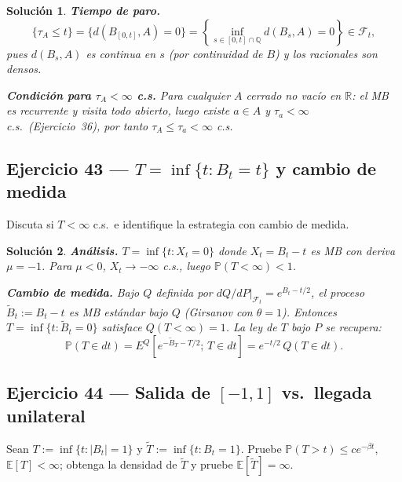 \documentclass[12pt,letterpaper]{article}
\theoremstyle{ejercicio}
\theoremstyle{solucion}
\newtheorem*{solucion}{Solución}
\newcommand{\E}{\mathbb{E}}
\newcommand{\R}{\mathbb{R}}
\newcommand{\F}{\mathcal{F}}
\renewcommand{\P}{\mathbb{P}}
\begin{document}
\begin{solucion}
\textbf{Tiempo de paro.}
\[
  \{\tau_A\le t\}=\{d(B_{[0,t]},A)=0\}
  =\left\{\inf_{s\in[0,t]\cap\mathbb{Q}}d(B_s,A)=0\right\}\in\F_t,
\]
pues $d(B_s,A)$ es continua en $s$ (por continuidad de $B$) y los racionales son densos.

\textbf{Condición para $\tau_A<\infty$ c.s.}
Para cualquier $A$ cerrado no vacío en $\R$: el MB es recurrente y visita todo abierto,
luego existe $a\in A$ y $\tau_a<\infty$ c.s.\ (Ejercicio~36), por tanto $\tau_A\le\tau_a<\infty$ c.s.
\end{solucion}

\subsection*{Ejercicio 43 — $T=\inf\{t:B_t=t\}$ y cambio de medida}

\begin{recuadro}
Discuta si $T<\infty$ c.s.\ e identifique la estrategia con cambio de medida.
\end{recuadro}

\begin{solucion}
\textbf{Análisis.} $T=\inf\{t:X_t=0\}$ donde $X_t=B_t-t$ es MB con deriva $\mu=-1$.
Para $\mu<0$, $X_t\to-\infty$ c.s., luego $\P(T<\infty)<1$.

\textbf{Cambio de medida.} Bajo $Q$ definida por
$dQ/dP|_{\F_t}=e^{B_t-t/2}$, el proceso $\tilde B_t:=B_t-t$ es MB estándar bajo $Q$
(Girsanov con $\theta=1$). Entonces $T=\inf\{t:\tilde B_t=0\}$ satisface $Q(T<\infty)=1$.
La ley de $T$ bajo $P$ se recupera:
\[
  \P(T\in dt)=E^Q\!\left[e^{-\tilde B_T-T/2};\,T\in dt\right]=e^{-t/2}\,Q(T\in dt).
\]
\end{solucion}

\subsection*{Ejercicio 44 — Salida de $[-1,1]$ vs.\ llegada unilateral}

\begin{recuadro}
Sean $T:=\inf\{t:|B_t|=1\}$ y $\tilde T:=\inf\{t:B_t=1\}$. Pruebe $\P(T>t)\le ce^{-\beta t}$,
$\E[T]<\infty$; obtenga la densidad de $\tilde T$ y pruebe $\E[\tilde T]=\infty$.
\end{recuadro}
\end{document}

